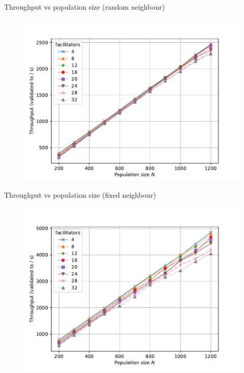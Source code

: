 \documentclass{beamer}
\begin{document}
\begin{frame}{Throughput vs population size (random neighbour)}
  \begin{figure}[h]
  \includegraphics[width=1.0\textwidth]{neighbour-random/throughput-vs-population}
  \centering
  \end{figure}
\end{frame}

\begin{frame}{Throughput vs population size (fixed neighbour)}
  \begin{figure}[h]
  \includegraphics[width=1.0\textwidth]{neighbour-fixed/throughput-vs-population}
  \centering
  \end{figure}
\end{frame}
\end{document}
